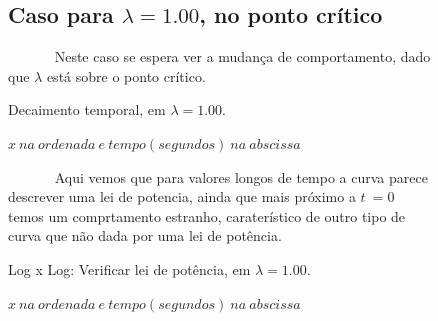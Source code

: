 \documentclass[pdftex,12pt,a4paper]{article}
\begin{document}
\begin{figure}
\subsection{Caso para $\lambda = 1.00$, no ponto crítico}
~~~~~~ Neste caso se espera ver a mudança de comportamento, dado que $\lambda$ está sobre o ponto crítico.

\centering
\caption{Decaimento temporal, em $\lambda = 1.00$.}
\caption*{$x\ na\ ordenada\ e\ tempo(segundos)\ na\ abscissa$}
\end{figure}

\begin{figure}
~~~~~~ Aqui vemos que para valores longos de tempo a curva parece descrever uma lei de potencia, ainda que mais próximo a $t\ = 0$ temos um comprtamento estranho, caraterístico de outro tipo de curva que não dada por uma lei de potência.

\centering
\caption{Log x Log: Verificar lei de potência, em $\lambda = 1.00$.}
\caption*{$x\ na\ ordenada\ e\ tempo(segundos)\ na\ abscissa$}
\end{figure}
\end{document}
